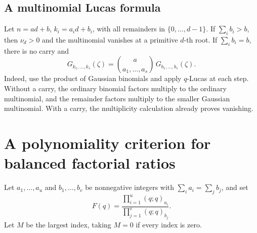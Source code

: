\documentclass[11pt,a4paper,oneside,openany]{book}
\theoremstyle{definition}
\theoremstyle{remark}
\begin{document}
\subsection{A multinomial Lucas formula}
Let \(n=ad+b\), \(k_i=a_id+b_i\), with all remainders in
\(\{0,\ldots,d-1\}\). If \(\sum_i b_i>b\), then \(\nu_d>0\)
and the multinomial vanishes at a primitive \(d\)-th root. If
\(\sum_i b_i=b\), there is no carry and
\begin{equation}\label{qcc:multinomial-lucas}
 G_{k_1,\ldots,k_s}(\zeta)
 =\binom{a}{a_1,\ldots,a_s}\,
                 G_{b_1,\ldots,b_s}(\zeta).
\end{equation}
Indeed, use the product of Gaussian binomials and apply \(q\)-Lucas at
each step. Without a carry, the ordinary binomial factors multiply to the
ordinary multinomial, and the remainder factors multiply to the smaller
Gaussian multinomial. With a carry, the multiplicity calculation already
proves vanishing.

\section{A polynomiality criterion for balanced factorial ratios}
Let \(a_1,\ldots,a_u\) and \(b_1,\ldots,b_v\) be nonnegative integers
with \(\sum_i a_i=\sum_j b_j\), and set
\[
 F(q)=\frac{\prod_{i=1}^{u}(q;q)_{a_i}}
                 {\prod_{j=1}^{v}(q;q)_{b_j}}.
\]
Let \(M\) be the largest index, taking \(M=0\) if every index is zero.
\end{document}
